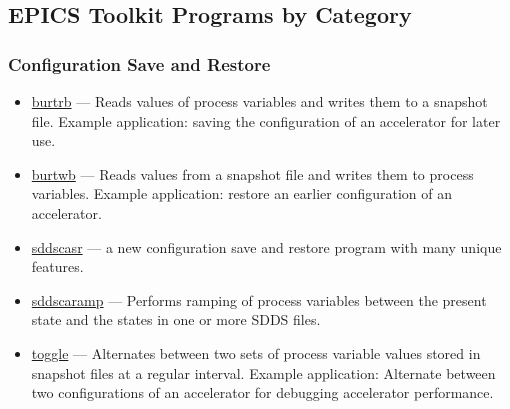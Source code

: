 \documentclass[11pt]{article}
\newcommand{\progref}[1]{\hyperref{#1}{{\tt #1} (}{)}{#1}}
\begin{document}
\subsection{EPICS Toolkit Programs by Category}
\subsubsection{Configuration Save and Restore}
\begin{itemize}
\item \progref{burtrb} --- Reads values of process variables and writes them to a snapshot file.
        Example application: saving the configuration of an accelerator for later use.
\item \progref{burtwb} --- Reads values from a snapshot file and writes them to process variables.
        Example application: restore an earlier configuration of an accelerator.
\item \progref{sddscasr} --- a new configuration save and restore program with many unique features.
\item \progref{sddscaramp} --- Performs ramping of process variables between
the present state and the states in one or more SDDS files.
\item \progref{toggle} --- Alternates between two sets of process variable values stored in snapshot files
        at a regular interval.
        Example application: Alternate between two configurations of an accelerator for debugging
        accelerator performance.
\end{itemize}
\end{document}
